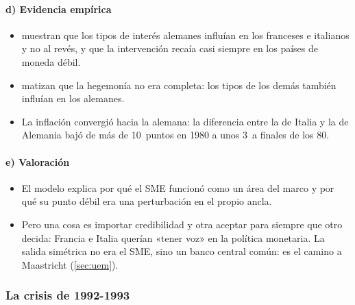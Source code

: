 \documentclass[11pt]{article}
\begin{document}
\paragraph{d) Evidencia empírica}

\begin{itemize}
\item \textcite{GiavazziGiovannini1989Limiting} muestran que los tipos de interés alemanes influían en los franceses e italianos y no al revés, y que la intervención recaía casi siempre en los países de moneda débil.
\item \textcite{FratianniVonHagen1990German} matizan que la hegemonía no era completa: los tipos de los demás también influían en los alemanes.
\item La inflación convergió hacia la alemana: la diferencia entre la de Italia y la de Alemania bajó de más de 10~puntos en 1980 a unos 3~a finales de los 80\nocite{DeGrauwe2022Economics}.
\end{itemize}

\paragraph{e) Valoración}

\begin{itemize}
\item El modelo explica por qué el SME funcionó como un área del marco y por qué su punto débil era una perturbación en el propio ancla.
\item Pero una cosa es importar credibilidad y otra aceptar para siempre que otro decida: Francia e Italia querían «tener voz» en la política monetaria. La salida simétrica no era el SME, sino un banco central común: es el camino a Maastricht (\ref{sec:uem}).
\end{itemize}

\subsubsection{La crisis de 1992-1993}\label{sec:sme-crisis}
\end{document}
